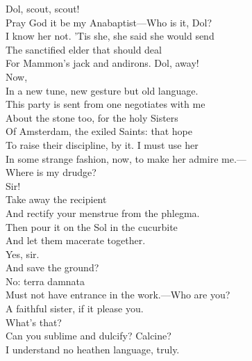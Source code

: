 \documentclass[a4paper,oneside,12pt]{memoir}
\begin{document}
\begin{drama*}
\subtlespeaks {} Dol, scout, scout!\\
Pray God it be my Anabaptist---Who is it, Dol?\\
\dolspeaks I know her not.
\subtlespeaks {} 'Tis she, she said she would send\\
The sanctified elder that should deal\\
For Mammon's jack and andirons. Dol, away!\\
 Now,\\
In a new tune, new gesture but old language.\\
This party is sent from one negotiates with me\\
About the stone too, for the holy Sisters\\
Of Amsterdam, the exiled Saints: that hope\\
To raise their discipline, by it. I must use her\\
In some strange fashion, now, to make her admire me.---\\
Where is my drudge?\\
\facespeaks {} Sir!\\
\subtlespeaks {} Take away the recipient\\
And rectify your menstrue from the phlegma.\\
Then pour it on the Sol in the cucurbite\\
And let them macerate together.\\
\facespeaks {} Yes, sir.\\
And save the ground?\\
\subtlespeaks {} No: terra damnata\\
Must not have entrance in the work.---Who are you?\\
\persecutionspeaks A faithful sister, if it please you.\\
\subtlespeaks {} What's that?\\
Can you sublime and dulcify? Calcine?\\
\persecutionspeaks I understand no heathen language, truly.\\

\end{drama*}
\end{document}
